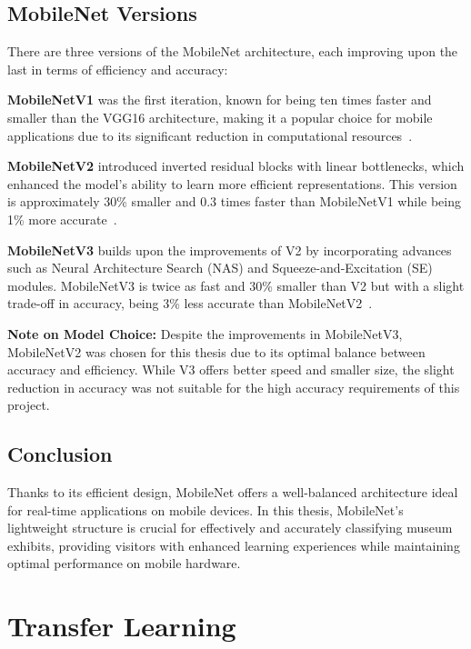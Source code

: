 \subsection{MobileNet Versions}

There are three versions of the MobileNet architecture, each improving upon the last in terms of efficiency and accuracy:

\textbf{MobileNetV1} was the first iteration, known for being ten times faster and smaller than the VGG16 architecture, making it a popular choice for mobile applications due to its significant reduction in computational resources~\cite{pandrii_mobilenet}.

\textbf{MobileNetV2} introduced inverted residual blocks with linear bottlenecks, which enhanced the model's ability to learn more efficient representations. This version is approximately 30\% smaller and 0.3 times faster than MobileNetV1 while being 1\% more accurate~\cite{pandrii_mobilenet}.

\textbf{MobileNetV3} builds upon the improvements of V2 by incorporating advances such as Neural Architecture Search (NAS) and Squeeze-and-Excitation (SE) modules. MobileNetV3 is twice as fast and 30\% smaller than V2 but with a slight trade-off in accuracy, being 3\% less accurate than MobileNetV2~\cite{pandrii_mobilenet}.

\textbf{Note on Model Choice:} Despite the improvements in MobileNetV3, MobileNetV2 was chosen for this thesis due to its optimal balance between accuracy and efficiency. While V3 offers better speed and smaller size, the slight reduction in accuracy was not suitable for the high accuracy requirements of this project.

\subsection{Conclusion}

Thanks to its efficient design, MobileNet offers a well-balanced architecture ideal for real-time applications on mobile devices. In this thesis, MobileNet's lightweight structure is crucial for effectively and accurately classifying museum exhibits, providing visitors with enhanced learning experiences while maintaining optimal performance on mobile hardware.

\section{Transfer Learning}\label{section:transfer_learning}

